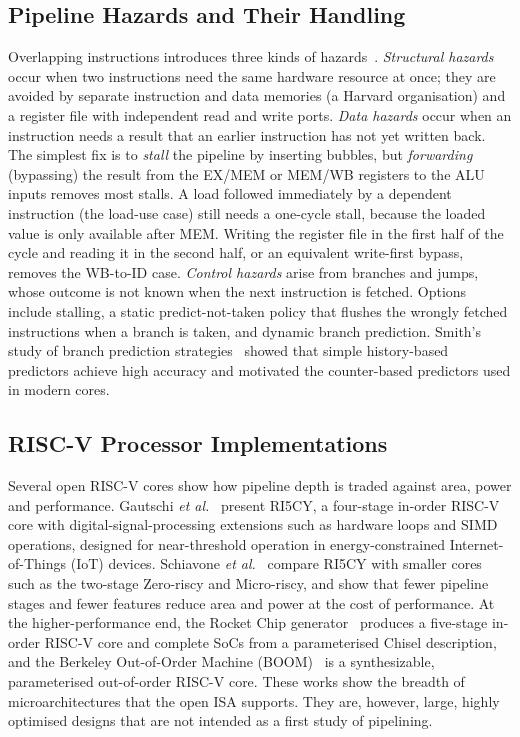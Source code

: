\subsection{Pipeline Hazards and Their Handling}
Overlapping instructions introduces three kinds of
hazards~\cite{ym_patterson_cod_riscv}. \emph{Structural hazards} occur when two
instructions need the same hardware resource at once; they are avoided by
separate instruction and data memories (a Harvard organisation) and a register
file with independent read and write ports. \emph{Data hazards} occur when an
instruction needs a result that an earlier instruction has not yet written back.
The simplest fix is to \emph{stall} the pipeline by inserting bubbles, but
\emph{forwarding} (bypassing) the result from the EX/MEM or MEM/WB registers to
the ALU inputs removes most stalls. A load followed immediately by a dependent
instruction (the load-use case) still needs a one-cycle stall, because the
loaded value is only available after MEM. Writing the register file in the first
half of the cycle and reading it in the second half, or an equivalent
write-first bypass, removes the WB-to-ID case. \emph{Control hazards} arise from
branches and jumps, whose outcome is not known when the next instruction is
fetched. Options include stalling, a static predict-not-taken policy that
flushes the wrongly fetched instructions when a branch is taken, and dynamic
branch prediction. Smith's study of branch prediction
strategies~\cite{ym_smith_branch} showed that simple history-based predictors
achieve high accuracy and motivated the counter-based predictors used in modern
cores.

\subsection{RISC-V Processor Implementations}
Several open RISC-V cores show how pipeline depth is traded against area, power
and performance. Gautschi \emph{et al.}~\cite{ym_gautschi_ri5cy} present RI5CY, a
four-stage in-order RISC-V core with digital-signal-processing extensions such as
hardware loops and SIMD operations, designed for near-threshold operation in
energy-constrained Internet-of-Things (IoT) devices. Schiavone \emph{et
al.}~\cite{ym_schiavone_ulp} compare RI5CY with smaller cores such as the
two-stage Zero-riscy and Micro-riscy, and show that fewer pipeline stages and
fewer features reduce area and power at the cost of performance. At the
higher-performance end, the Rocket Chip generator~\cite{ym_asanovic_rocket}
produces a five-stage in-order RISC-V core and complete SoCs from a
parameterised Chisel description, and the Berkeley Out-of-Order Machine
(BOOM)~\cite{ym_celio_boom} is a synthesizable, parameterised out-of-order
RISC-V core. These works show the breadth of microarchitectures that the open
ISA supports. They are, however, large, highly optimised designs that are not
intended as a first study of pipelining.

